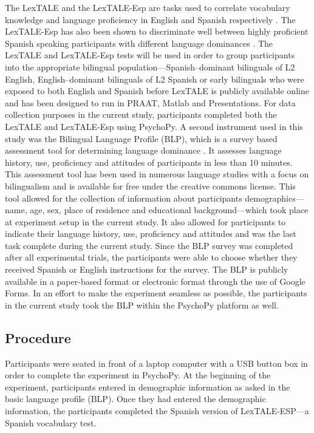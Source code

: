 The LexTALE and the LexTALE-Esp are tasks used to correlate vocabulary knowledge and language proficiency in English and Spanish respectively \parencite{Izura2014-yw,Lemhofer2012-hz}. The LexTALE-Esp has also been shown to discriminate well between highly proficient Spanish speaking participants with different language dominances \parencite{Ferre2017-jq}. The LexTALE and LexTALE-Esp tests will be used in order to group participants into the appropriate bilingual population—Spanish–dominant bilinguals of L2 English, English–dominant bilinguals of L2 Spanish or early bilinguals who were exposed to both English and Spanish before %
LexTALE is publicly available online and has been designed to run in PRAAT, Matlab and Presentations. For data collection purposes in the current study, participants completed both the LexTALE and LexTALE-Esp using PsychoPy. 
A second instrument used in this study was the Bilingual Language Profile (BLP), which is a survey based assessment tool for determining language dominance \parencite{Birdsong2012-wd}. It assesses language history, use, proficiency and attitudes of participants in less than 10 minutes. This assessment tool has been used in numerous language studies with a focus on bilingualism and is available for free under the creative commons license. This tool allowed for the collection of information about participants demographics---name, age, sex, place of residence and educational background---which took place at experiment setup in the current study. It also allowed for participants to indicate their language history, use, proficiency and attitudes and was the last task complete during the current study. Since the BLP survey was completed after all experimental trials, the participants were able to choose whether they received Spanish or English instructions for the survey. The BLP is publicly available in a paper-based format or electronic format through the use of Google Forms. In an effort to make the experiment seamless as possible, the participants in the current study took the BLP within the PsychoPy platform as well. 




\subsection{Procedure}
Participants were seated in front of a laptop computer with a USB button box in order to complete the experiment in PsychoPy. At the beginning of the experiment, participants entered in demographic information as asked in the basic language profile (BLP). Once they had entered the demographic information, the participants completed the Spanish version of LexTALE-ESP---a Spanish vocabulary test. 


